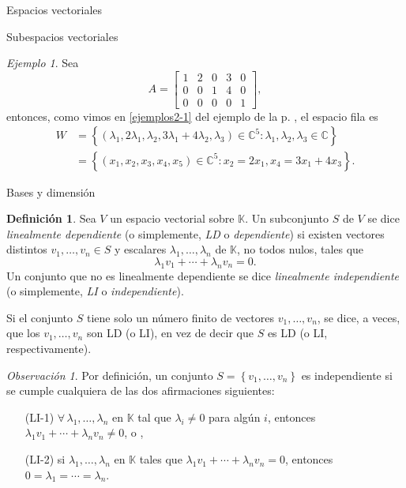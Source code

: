 \documentclass[a4paper,12pt,twoside,spanish,reqno]{amsbook}
\numberwithin{equation}{section}
\theoremstyle{definition}
\newtheorem{definicion}[teorema]{Definici\'on}
\theoremstyle{remark}
\newtheorem*{ejemplo*}{Ejemplo}
\newtheorem*{observacion*}{Observaci\'on}
\newcommand{\C}{\mathbb C}
\newcommand{\K}{\mathbb K}
\begin{document}
\begin{chapter}{Espacios vectoriales}
\begin{section}{Subespacios vectoriales}
    \begin{ejemplo*}
        Sea
        $$
        A = \begin{bmatrix}
        1&2&0&3&0\\ 0&0&1&4&0 \\0&0&0&0&1
        \end{bmatrix},
        $$
        entonces, como vimos en \ref{ejemplos2-1} del ejemplo de la p. \pageref{ejemplos2}, el espacio fila es
        \begin{align*}
        W &= \left\{(\lambda_1,2\lambda_1,\lambda_2,3\lambda_1+4\lambda_2,\lambda_3)\in \C^5: \lambda_1,\lambda_2, \lambda_3 \in \C \right\} \\
        &=\left\{(x_1,x_2,x_3,x_4,x_5)\in \C^5: x_2 = 2x_1, x_4 = 3x_1+4x_3 \right\}.
        \end{align*}
    \end{ejemplo*}
\end{section}		
        
\begin{section}{Bases y dimensión}\label{seccion-bases-y-dimension}
    \begin{definicion}
        Sea $V$ un espacio vectorial sobre $\K$. Un subconjunto $S$ de $V$ se dice \textit{linealmente dependiente} (o simplemente, \textit{LD} o \textit{dependiente}) si existen vectores distintos $v_1,\ldots,v_n \in S$  y escalares $\lambda_1,\ldots,\lambda_n$ de $\K$, no todos nulos, tales que 	
        \begin{equation*}
            \lambda_1v_1+\cdots+\lambda_nv_n=0.
        \end{equation*}
        Un conjunto que no es linealmente dependiente se dice \textit{linealmente independiente} (o simplemente, \textit{LI} o \textit{independiente}).
        
        Si el conjunto $S$ tiene solo un número finito de vectores $v_1,\ldots,v_n$, se dice,
        a veces, que los $v_1,\ldots,v_n$ son LD (o LI), en vez de decir
        que $S$ es LD (o LI, respectivamente).
        
    \end{definicion}

\begin{observacion*} Por definición, un conjunto $S = \left\{v_1,\ldots,v_n \right\}$ es independiente si se cumple cualquiera de las dos afirmaciones siguientes:
	
	\begin{itemize}
		\item[(LI-1)]\label{LT-1} $\forall\,\lambda_1,\ldots,\lambda_n$ en $\K$ tal que $\lambda_i \ne 0$ para algún $i$,  entonces  $\lambda_1v_1+\cdots+\lambda_nv_n\not=0$, o , 
		\item[(LI-2)]\label{LT-2} si $\lambda_1,\ldots,\lambda_n$ en $\K$ tales que $\lambda_1v_1+\cdots+\lambda_nv_n=0$,  entonces $0=\lambda_1=\cdots=\lambda_n$.
	\end{itemize}



\end{observacion*}
\end{section}
\end{chapter}
\end{document}
